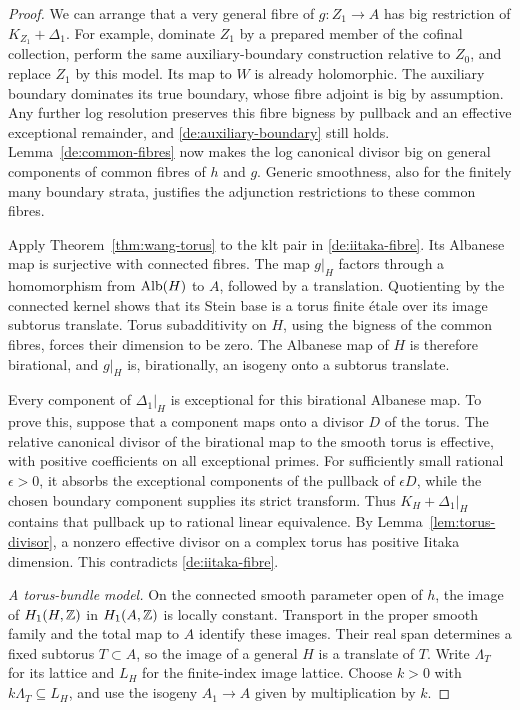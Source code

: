 \begin{proof}
We can arrange that a very general fibre of \(g:Z_1\to A\) has big
restriction of \(K_{Z_1}+\Delta_1\). For example, dominate
\(Z_1\) by a prepared member of the cofinal collection, perform
the same auxiliary-boundary construction relative to \(Z_0\), and
replace \(Z_1\) by this model. Its map to \(W\) is already
holomorphic. The auxiliary boundary dominates its true boundary,
whose fibre adjoint is big by assumption. Any further log resolution
preserves this fibre bigness by pullback and an effective exceptional
remainder, and \eqref{de:auxiliary-boundary} still holds.
Lemma~\ref{de:common-fibres} now makes the log canonical divisor big
on general components of common fibres of \(h\) and \(g\).
Generic smoothness, also for the finitely many boundary strata,
justifies the adjunction restrictions to these common fibres.

Apply Theorem~\ref{thm:wang-torus} to the klt pair in
\eqref{de:iitaka-fibre}. Its Albanese map is surjective with connected
fibres. The map \(g|_H\) factors through a homomorphism from
\(\operatorname{Alb}(H)\) to \(A\), followed by a translation. Quotienting by
the connected kernel shows that its Stein base is a torus finite
\'etale over its image subtorus translate. Torus subadditivity
on \(H\), using the bigness of the common fibres, forces their
dimension to be zero. The Albanese map of \(H\) is therefore
birational, and \(g|_H\) is, birationally, an isogeny onto a
subtorus translate.

Every component of \(\Delta_1|_H\) is exceptional for this
birational Albanese map. To prove this, suppose that a component maps
onto a divisor \(D\) of the torus. The relative canonical divisor
of the birational map to the smooth torus is effective, with positive
coefficients on all exceptional primes. For sufficiently small
rational \(\epsilon>0\), it absorbs the exceptional components of
the pullback of \(\epsilon D\), while the chosen boundary
component supplies its strict transform. Thus
\(K_H+\Delta_1|_H\) contains that pullback up to rational linear
equivalence. By Lemma~\ref{lem:torus-divisor}, a nonzero effective
divisor on a complex torus has positive Iitaka dimension. This contradicts
\eqref{de:iitaka-fibre}.

\medskip\noindent
\emph{A torus-bundle model.}
On the connected smooth parameter open of \(h\), the image of
\(H_1(H,\mathbb Z)\) in \(H_1(A,\mathbb Z)\) is locally constant. Transport
in the proper smooth family and the total map to \(A\) identify
these images. Their real span determines a fixed subtorus
\(T\subset A\), so the image of a general \(H\) is a translate
of \(T\). Write \(\Lambda_T\) for its lattice and \(L_H\)
for the finite-index image lattice. Choose \(k>0\) with
\(k\Lambda_T\subseteq L_H\), and use the isogeny
\(A_1\to A\) given by multiplication by \(k\).


\end{proof}
